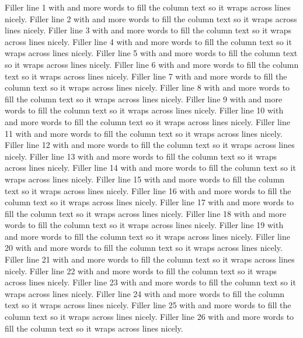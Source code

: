 Filler line 1 with  and more words to fill the column text so it wraps across lines nicely.
Filler line 2 with  and more words to fill the column text so it wraps across lines nicely.
Filler line 3 with  and more words to fill the column text so it wraps across lines nicely.
Filler line 4 with  and more words to fill the column text so it wraps across lines nicely.
Filler line 5 with  and more words to fill the column text so it wraps across lines nicely.
Filler line 6 with  and more words to fill the column text so it wraps across lines nicely.
Filler line 7 with  and more words to fill the column text so it wraps across lines nicely.
Filler line 8 with  and more words to fill the column text so it wraps across lines nicely.
Filler line 9 with  and more words to fill the column text so it wraps across lines nicely.
Filler line 10 with  and more words to fill the column text so it wraps across lines nicely.
Filler line 11 with  and more words to fill the column text so it wraps across lines nicely.
Filler line 12 with  and more words to fill the column text so it wraps across lines nicely.
Filler line 13 with  and more words to fill the column text so it wraps across lines nicely.
Filler line 14 with  and more words to fill the column text so it wraps across lines nicely.
Filler line 15 with  and more words to fill the column text so it wraps across lines nicely.
Filler line 16 with  and more words to fill the column text so it wraps across lines nicely.
Filler line 17 with  and more words to fill the column text so it wraps across lines nicely.
Filler line 18 with  and more words to fill the column text so it wraps across lines nicely.
Filler line 19 with  and more words to fill the column text so it wraps across lines nicely.
Filler line 20 with  and more words to fill the column text so it wraps across lines nicely.
Filler line 21 with  and more words to fill the column text so it wraps across lines nicely.
Filler line 22 with  and more words to fill the column text so it wraps across lines nicely.
Filler line 23 with  and more words to fill the column text so it wraps across lines nicely.
Filler line 24 with  and more words to fill the column text so it wraps across lines nicely.
Filler line 25 with  and more words to fill the column text so it wraps across lines nicely.
Filler line 26 with  and more words to fill the column text so it wraps across lines nicely.
